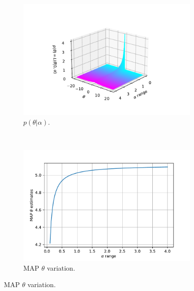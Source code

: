 \documentclass{article}
\begin{document}
\begin{figure}[htb!]
     \centering
     \begin{subfigure}[b]{0.45\textwidth}
         \centering
         \includegraphics[width=\textwidth]{Q1a_8.pdf}
         \caption{$p(\theta \vert \alpha)$.}
     \end{subfigure}
     ~
     \begin{subfigure}[b]{0.45\textwidth}
         \centering
         \includegraphics[width=\textwidth]{Q1a_9.pdf}
         \caption{MAP $\theta$ variation.}
     \end{subfigure}
     

\end{figure}
\end{document}
